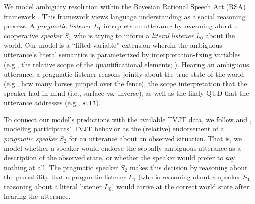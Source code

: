 \documentclass[10pt,a4paper]{article}
\newcommand{\gcs}[1]{\textcolor{blue}{[gcs: #1]}}
\newcommand{\lsp}[1]{\textcolor{violet}{[lsp: #1]}}
\begin{document}
We model  ambiguity resolution within the Bayesian Rational Speech Act (RSA) framework \cite{goodmanfrank2016}. This framework views language understanding as a social reasoning process. A \textit{pragmatic listener} $L_1$ interprets an utterance by reasoning about a cooperative \textit{speaker} $S_1$ who is trying to inform a \textit{literal listener} $L_0$ about the world.
Our model is a ``lifted-variable'' extension wherein the ambiguous utterance's literal semantics is parameterized by interpretation-fixing variables (e.g., the relative scope of the quantificational elements; ). Hearing an ambiguous utterance, a pragmatic listener reasons jointly about the true state of the world (e.g., how many horses jumped over the fence), the scope interpretation that the speaker had in mind (i.e., surface vs.~inverse), as well as the likely QUD that the utterance addresses (e.g., \texttt{all?}).  %

To connect our model's predictions with the available TVJT data, we follow  and , modeling participants' TVJT behavior as the (relative) endorsement of  a \textit{pragmatic speaker} $S_2$ for an utterance about an observed situation. That is, we model whether a speaker would endorse the scopally-ambiguous utterance as a description of the observed state, or whether the speaker would prefer to say nothing at all.  
The pragmatic speaker $S_2$ makes this decision by reasoning about the probability that a pragmatic listener $L_1$ (who is reasoning about a speaker $S_1$ reasoning about a literal listener $L_0$) would arrive at the correct world state after hearing the utterance. 
\end{document}

